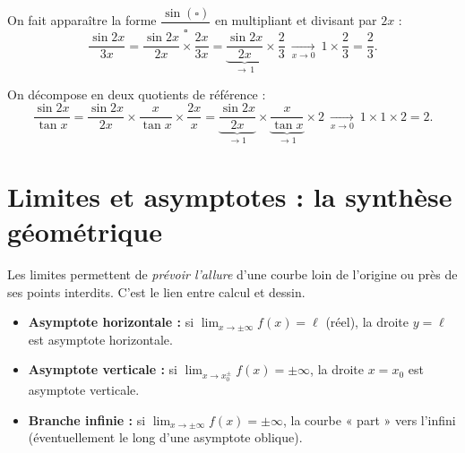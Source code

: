 \documentclass[11pt,a4paper]{article}
\begin{document}
\begin{exemple}
On fait apparaître la forme $\dfrac{\sin(\square)}{\square}$ en multipliant et divisant par $2x$ :
\[ \frac{\sin 2x}{3x}=\frac{\sin 2x}{2x}\times\frac{2x}{3x}=\underbrace{\frac{\sin 2x}{2x}}_{\to\,1}\times\frac{2}{3}\ \xrightarrow[x\to 0]{}\ 1\times\frac23=\frac23. \]
\end{exemple}

\begin{exemple}
On décompose en deux quotients de référence :
\[ \frac{\sin 2x}{\tan x}=\frac{\sin 2x}{2x}\times\frac{x}{\tan x}\times\frac{2x}{x}
   =\underbrace{\frac{\sin 2x}{2x}}_{\to 1}\times\underbrace{\frac{x}{\tan x}}_{\to 1}\times 2\ \xrightarrow[x\to 0]{}\ 1\times1\times2=2. \]
\end{exemple}

\section{Limites et asymptotes : la synthèse géométrique}
Les limites permettent de \emph{prévoir l'allure} d'une courbe loin de l'origine ou près de ses
points interdits. C'est le lien entre calcul et dessin.

\begin{theoreme}
\begin{itemize}[leftmargin=1.6em,topsep=2pt,itemsep=3pt]
  \item \textbf{Asymptote horizontale :} si $\displaystyle\lim_{x\to\pm\infty} f(x)=\ell$ (réel), la droite $y=\ell$ est asymptote horizontale.
  \item \textbf{Asymptote verticale :} si $\displaystyle\lim_{x\to x_0^{\pm}} f(x)=\pm\infty$, la droite $x=x_0$ est asymptote verticale.
  \item \textbf{Branche infinie :} si $\displaystyle\lim_{x\to\pm\infty} f(x)=\pm\infty$, la courbe « part » vers l'infini (éventuellement le long d'une asymptote oblique).
\end{itemize}
\end{theoreme}
\end{document}

